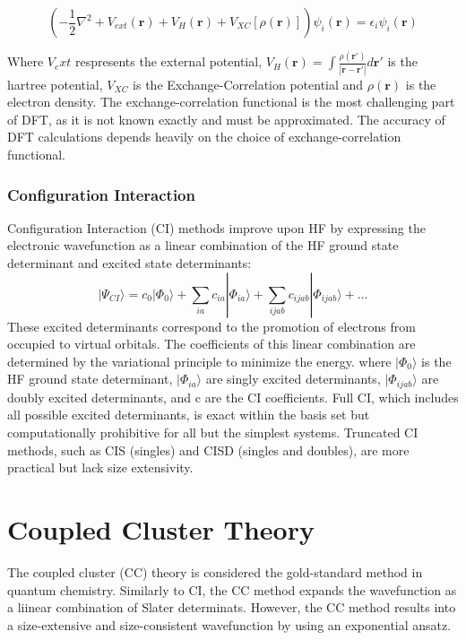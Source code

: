 \begin{equation}\label{eq:KSDFT}
    \left( -\frac{1}{2} \nabla^2 + V_{ext}(\mathbf{r}) + V_H(\mathbf{r}) + V_{XC}[\rho(\mathbf{r})] \right) \psi_i(\mathbf{r}) = \epsilon_i \psi_i(\mathbf{r})
\end{equation}

Where $V_ext$ respresents the external potential, $V_H(\mathbf{r}) = \int \frac{\rho(\mathbf{r}')}{|\mathbf{r} - \mathbf{r}'|} d\mathbf{r}'$ is the hartree potential, $V_{XC}$ is the Exchange-Correlation potential and $\rho(\mathbf{r})$ is the electron density. The exchange-correlation functional is the most challenging part of DFT, as it is not known exactly and must be approximated. The accuracy of DFT calculations depends heavily on the choice of exchange-correlation functional.

\subsubsection{Configuration Interaction}
Configuration Interaction (CI) methods improve upon HF by expressing the electronic wavefunction as a linear combination of the HF ground state determinant and excited state determinants:
\begin{equation} \label{eq:CI}
     |\Psi_{CI} \rangle = c_0 |\Phi_0 \rangle + \sum_{ia} c_{ia} |\Phi_{ia} \rangle + \sum_{ijab} c_{ijab} |\Phi_{ijab} \rangle + \dots
\end{equation}
These excited determinants correspond to the promotion of electrons from occupied to virtual orbitals. The coefficients of this linear combination are determined by the variational principle to minimize the energy.
where $|\Phi_0 \rangle$ is the HF ground state determinant, $|\Phi_{ia} \rangle$ are singly excited determinants, $|\Phi_{ijab} \rangle$ are doubly excited determinants, and c are the CI coefficients. Full CI, which includes all possible excited determinants, is exact within the basis set but computationally prohibitive for all but the simplest systems. Truncated CI methods, such as CIS (singles) and CISD (singles and doubles), are more practical but lack size extensivity.

\section{Coupled Cluster Theory} \label{sec:CCTheory}
The coupled cluster (CC) theory is considered the gold-standard method in quantum chemistry. Similarly to CI, the CC method expands the wavefunction as a liinear combination of Slater determinats. However, the CC method results into a size-extensive and size-consistent wavefunction by using an exponential ansatz.

